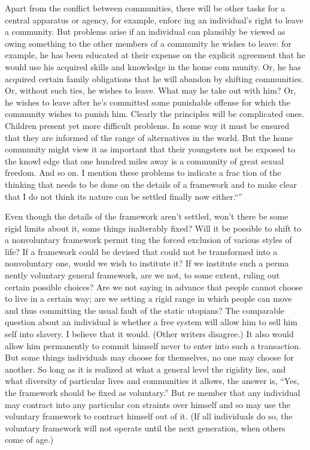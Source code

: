 \documentclass[11pt,openany]{book}
\begin{document}
Apart from the conflict between communities, there will be other tasks for a central apparatus or agency, for example, enforc ing an individual's right to leave a community. But problems arise if an individual can plausibly be viewed as owing something to the other members of a community he wishes to leave: for example, he has been educated at their expense on the explicit agreement that he would use his acquired skills and knowledge in the home com munity. Or, he has acquired certain family obligations that he will abandon by shifting communities. Or, without such ties, he wishes to leave. What may he take out with him? Or, he wishes to leave after he's committed some punishable offense for which the community wishes to punish him. Clearly the principles will be complicated ones. Children present yet more difficult problems. In some way it must be ensured that they are informed of the range of alternatives in the world. But the home community might view it as important that their youngsters not be exposed to the knowl edge that one hundred miles away is a community of great sexual freedom. And so on. I mention these problems to indicate a frac tion of the thinking that needs to be done on the details of a framework and to make clear that I do not think its nature can be settled finally now either.``'' 

Even though the details of the framework aren't settled, won't there be some rigid limits about it, some things inalterably fixed? Will it be possible to shift to a nonvoluntary framework permit ting the forced exclusion of various styles of life? If a framework could be devised that could not be transformed into a nonvoluntary one, would we wish to institute it? If we institute such a perma nently voluntary general framework, are we not, to some extent, ruling out certain possible choices? Are we not saying in advance that people cannot choose to live in a certain way; are we setting a rigid range in which people can move and thus committing the usual fault of the static utopians? The comparable question about an individual is whether a free system will allow him to sell him self into slavery. I believe that it would. (Other writers disagree.) It also would allow him permanently to commit himself never to enter into such a transaction. But some things individuals may choose for themselves, no one may choose for another. So long as it is realized at what a general level the rigidity lies, and what diversity of particular lives and communities it allows, the answer is, ``Yes, the framework should be fixed as voluntary.'' But re member that any individual may contract into any particular con straints over himself and so may use the voluntary framework to contract himself out of it. (If all individuals do so, the voluntary framework will not operate until the next generation, when others come of age.) 
\end{document}
